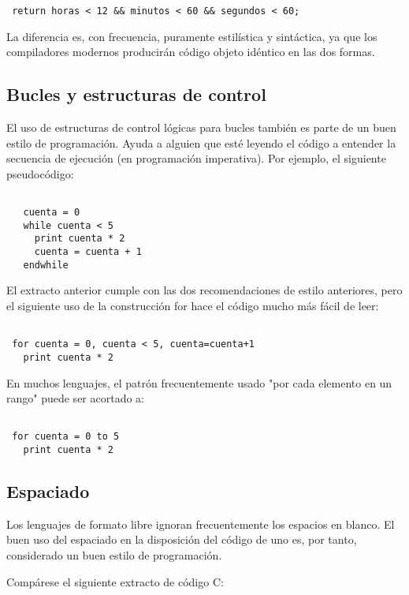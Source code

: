 \documentclass[11pt]{article}
\begin{document}
\begin{verbatim}
 return horas < 12 && minutos < 60 && segundos < 60;
\end{verbatim}

La diferencia es, con frecuencia, puramente estilística y sintáctica,
ya que los compiladores modernos producirán código objeto idéntico en
las dos formas.

\subsection*{Bucles y estructuras de control}
\label{sec:org41e073b}

El uso de estructuras de control lógicas para bucles también es parte
 de un buen estilo de programación. Ayuda a alguien que esté leyendo
 el código a entender la secuencia de ejecución (en programación
 imperativa). Por ejemplo, el siguiente pseudocódigo:
\begin{verbatim}

   cuenta = 0
   while cuenta < 5
     print cuenta * 2
     cuenta = cuenta + 1
   endwhile
\end{verbatim}

El extracto anterior cumple con las dos recomendaciones de estilo
anteriores, pero el siguiente uso de la construcción for hace el
código mucho más fácil de leer:

\begin{verbatim}

 for cuenta = 0, cuenta < 5, cuenta=cuenta+1
   print cuenta * 2
\end{verbatim}

En muchos lenguajes, el patrón frecuentemente usado "por cada elemento
en un rango" puede ser acortado a:

\begin{verbatim}

 for cuenta = 0 to 5
   print cuenta * 2
\end{verbatim}

\subsection*{Espaciado}
\label{sec:org47fa7f3}

Los lenguajes de formato libre ignoran frecuentemente los espacios
en blanco. El buen uso del espaciado en la disposición del código
de uno es, por tanto, considerado un buen estilo de programación.

Compárese el siguiente extracto de código C:
\end{document}
